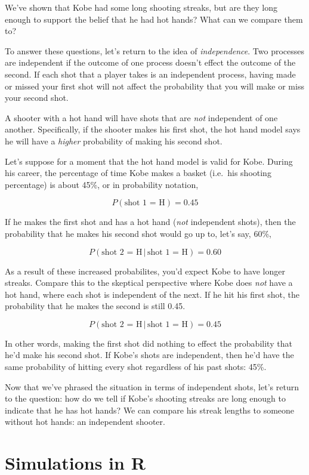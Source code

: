 \documentclass[]{book}
\theoremstyle{definition}
\theoremstyle{definition}
\theoremstyle{remark}
\begin{document}
We've shown that Kobe had some long shooting streaks, but are they long
enough to support the belief that he had hot hands? What can we compare
them to?

To answer these questions, let's return to the idea of
\emph{independence}. Two processes are independent if the outcome of one
process doesn't effect the outcome of the second. If each shot that a
player takes is an independent process, having made or missed your first
shot will not affect the probability that you will make or miss your
second shot.

A shooter with a hot hand will have shots that are \emph{not}
independent of one another. Specifically, if the shooter makes his first
shot, the hot hand model says he will have a \emph{higher} probability
of making his second shot.

Let's suppose for a moment that the hot hand model is valid for Kobe.
During his career, the percentage of time Kobe makes a basket (i.e.~his
shooting percentage) is about 45\%, or in probability notation,

\[ P(\textrm{shot 1 = H}) = 0.45 \]

If he makes the first shot and has a hot hand (\emph{not} independent
shots), then the probability that he makes his second shot would go up
to, let's say, 60\%,

\[ P(\textrm{shot 2 = H} \, | \, \textrm{shot 1 = H}) = 0.60 \]

As a result of these increased probabilites, you'd expect Kobe to have
longer streaks. Compare this to the skeptical perspective where Kobe
does \emph{not} have a hot hand, where each shot is independent of the
next. If he hit his first shot, the probability that he makes the second
is still 0.45.

\[ P(\textrm{shot 2 = H} \, | \, \textrm{shot 1 = H}) = 0.45 \]

In other words, making the first shot did nothing to effect the
probability that he'd make his second shot. If Kobe's shots are
independent, then he'd have the same probability of hitting every shot
regardless of his past shots: 45\%.

Now that we've phrased the situation in terms of independent shots,
let's return to the question: how do we tell if Kobe's shooting streaks
are long enough to indicate that he has hot hands? We can compare his
streak lengths to someone without hot hands: an independent shooter.

\section*{Simulations in R}\label{simulations-in-r}
\end{document}
